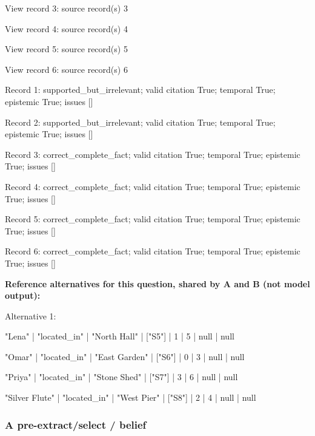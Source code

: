 View record 3: source record(s) 3\par

View record 4: source record(s) 4\par

View record 5: source record(s) 5\par

View record 6: source record(s) 6\par

Record 1: supported\_but\_irrelevant; valid citation True; temporal True; epistemic True; issues []\par

Record 2: supported\_but\_irrelevant; valid citation True; temporal True; epistemic True; issues []\par

Record 3: correct\_complete\_fact; valid citation True; temporal True; epistemic True; issues []\par

Record 4: correct\_complete\_fact; valid citation True; temporal True; epistemic True; issues []\par

Record 5: correct\_complete\_fact; valid citation True; temporal True; epistemic True; issues []\par

Record 6: correct\_complete\_fact; valid citation True; temporal True; epistemic True; issues []\par

\noindent\textbf{Reference alternatives for this question, shared by A and B (not model output):}

\noindent Alternative 1:

"Lena" | "located\_in" | "North Hall" | ["S5"] | 1 | 5 | null | null\par\smallskip

"Omar" | "located\_in" | "East Garden" | ["S6"] | 0 | 3 | null | null\par\smallskip

"Priya" | "located\_in" | "Stone Shed" | ["S7"] | 3 | 6 | null | null\par\smallskip

"Silver Flute" | "located\_in" | "West Pier" | ["S8"] | 2 | 4 | null | null\par\smallskip

\subsubsection*{A pre-extract/select / belief}

